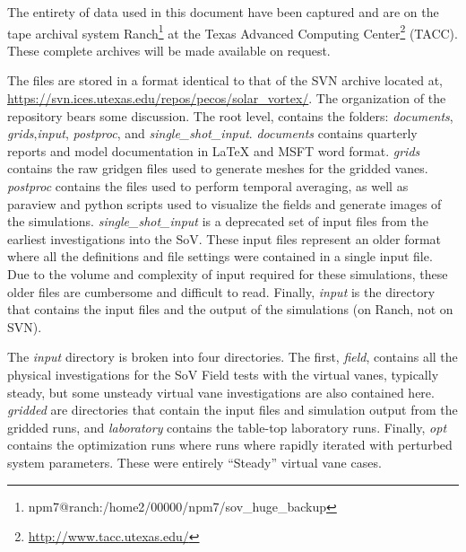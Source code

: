 \label{sec:archiving}


The entirety of data used in this document have been captured and
are on the tape archival system
Ranch\footnote{\normalsize npm7@ranch:/home2/00000/npm7/sov\_huge\_backup} 
at the Texas Advanced Computing Center\footnote{%
    \normalsize \url{http://www.tacc.utexas.edu/}
}
(TACC).  These complete archives will be made available on request. 

The files are stored in a format identical to that of the SVN archive
located at,
\url{https://svn.ices.utexas.edu/repos/pecos/solar_vortex/}. The
organization of the repository bears some discussion. The root level,
contains the folders: {\it documents}, {\it grids},{\it input}, {\it
postproc}, and {\it single\_shot\_input}. {\it documents} contains
quarterly reports and model documentation in LaTeX and MSFT word format.  
{\it grids} contains the raw gridgen files used to generate meshes for
the gridded vanes. {\it postproc} contains the files used to perform
temporal averaging, as well as paraview and python scripts used to
visualize the fields and generate images of the simulations. {\it
single\_shot\_input} is a deprecated set of input files from the
earliest investigations into the SoV. These input files represent an
older format where all the definitions and file settings were contained
in a single input file. Due to the volume and complexity of input
required for these simulations, these older files are cumbersome and
 difficult to read. Finally, {\it input} is the directory that
contains the input files and the output of the simulations (on
Ranch, not on SVN). 

The {\it input} directory is broken into four directories. The first,
{\it field}, contains all the physical investigations for the SoV Field
tests with the virtual vanes, typically steady, but some unsteady
virtual vane investigations are also contained here. {\it gridded} are
directories that contain the input files and simulation output from the
gridded runs, and {\it laboratory} contains the table-top laboratory
runs. Finally, {\it opt} contains the optimization runs where runs where
rapidly iterated with perturbed system parameters. These were entirely
``Steady'' virtual vane cases. 

